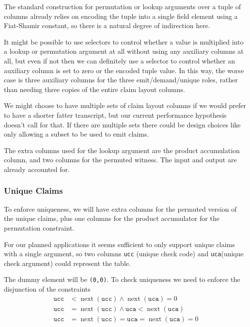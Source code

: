 \documentclass{article}
\theoremstyle{plain}
\theoremstyle{definition}
\begin{document}
The standard construction for permutation or lookup arguments over a
tuple of columns already relies on encoding the tuple into a single
field element using a Fiat-Shamir constant, so there is a natural degree
of indirection here.

It might be possible to use selectors to control whether a value is
multiplied into a lookup or permutation argument at all without using
any auxiliary columns at all, but even if not then we can definitely use
a selector to control whether an auxiliary column is set to zero or the
encoded tuple value. In this way, the worse case is three auxiliary
columns for the three emit/demand/unique roles, rather than needing
three copies of the entire claim layout columns.

We might choose to have multiple sets of claim layout columns if we
would prefer to have a shorter fatter transcript, but our current
performance hypothesis doesn't call for that. If there are multiple sets
there could be design choices like only allowing a subset to be used to
emit claims.

The extra columns used for the lookup argument are the product
accumulation column, and two columns for the permuted witness. The input
and output are already accounted for.

\subsubsection{Unique Claims}\label{unique-claims}

To enforce uniqueness, we will have extra columns for the permuted
version of the unique claims, plus one columns for the product
accumulator for the permutation constraint.

\newcommand{\ucc}{\texttt{ucc}}
\newcommand{\uca}{\texttt{uca}}
For our planned applications it seems sufficient to only support unique
claims with a single argument, so two columns \ucc
(unique check code) and \uca (unique check argument)
could represent the table.

The dummy element will be \texttt{(0,0)}. To check uniqueness we need to
enforce the disjunction of the constraints
\begin{align*}
\ucc & < \operatorname{next}(\ucc) \wedge \operatorname{next}(\uca) = 0 \\
\ucc & = \operatorname{next}(\ucc) \wedge \uca < \operatorname{next}(\uca) \\
\ucc & = \operatorname{next}(\ucc) = \uca = \operatorname{next}(\uca) = 0
\end{align*}
\end{document}
